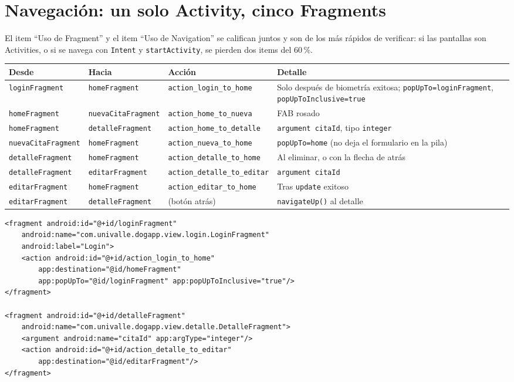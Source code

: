 \documentclass[11pt,letterpaper]{article}
\newcommand{\code}[1]{\texttt{\small #1}}
\begin{document}
\section{Navegaci\'on: un solo Activity, cinco Fragments}
\label{sec:nav}

El item ``Uso de Fragment'' y el item ``Uso de Navigation'' se califican juntos y
son de los m\'as r\'apidos de verificar: si las pantallas son Activities, o si se
navega con \code{Intent} y \code{startActivity}, se pierden dos items del 60\,\%.

\begin{center}
\small
\begin{xltabular}{\linewidth}{@{}l l l X@{}}
\toprule
\textbf{Desde} & \textbf{Hacia} & \textbf{Acci\'on} & \textbf{Detalle}\\
\midrule
\endhead
\bottomrule
\endlastfoot
\code{loginFragment} & \code{homeFragment} & \code{action\_login\_to\_home} & Solo despu\'es de biometr\'ia exitosa; \code{popUpTo=\allowbreak{}loginFragment}, \code{popUpToInclusive=\allowbreak{}true}\\
\code{homeFragment} & \code{nuevaCitaFragment} & \code{action\_home\_to\_nueva} & FAB rosado\\
\code{homeFragment} & \code{detalleFragment} & \code{action\_home\_to\_detalle} & \code{argument citaId}, tipo \code{integer}\\
\code{nuevaCitaFragment} & \code{homeFragment} & \code{action\_nueva\_to\_home} & \code{popUpTo=\allowbreak{}home} (no deja el formulario en la pila)\\
\code{detalleFragment} & \code{homeFragment} & \code{action\_detalle\_to\_home} & Al eliminar, o con la flecha de atr\'as\\
\code{detalleFragment} & \code{editarFragment} & \code{action\_detalle\_to\_editar} & \code{argument citaId}\\
\code{editarFragment} & \code{homeFragment} & \code{action\_editar\_to\_home} & Tras \code{update} exitoso\\
\code{editarFragment} & \code{detalleFragment} & (bot\'on atr\'as) & \code{navigateUp(\allowbreak{})} al detalle\\
\end{xltabular}
\end{center}

\begin{verbatim}
<fragment android:id="@+id/loginFragment"
    android:name="com.univalle.dogapp.view.login.LoginFragment"
    android:label="Login">
    <action android:id="@+id/action_login_to_home"
        app:destination="@id/homeFragment"
        app:popUpTo="@id/loginFragment" app:popUpToInclusive="true"/>
</fragment>

<fragment android:id="@+id/detalleFragment"
    android:name="com.univalle.dogapp.view.detalle.DetalleFragment">
    <argument android:name="citaId" app:argType="integer"/>
    <action android:id="@+id/action_detalle_to_editar"
        app:destination="@id/editarFragment"/>
</fragment>
\end{verbatim}
\end{document}
